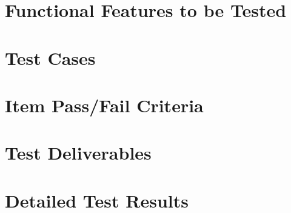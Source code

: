 \documentclass[a4paper,12pt]{article}
\begin{document}
	\section{Functional Features to be Tested}	
		
	
	
	
	\section{Test Cases}	
		
	
	
	
	\section{Item Pass/Fail Criteria}	
	
	
	
	
	\section{Test Deliverables}	 
		

	
	
	
	\section{Detailed Test Results}	 
		
	
	
\end{document}
